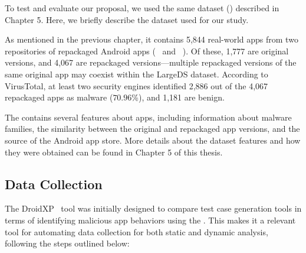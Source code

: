 

To test and evaluate our proposal, we used the same dataset (\cds) described in Chapter 5. Here, we briefly describe the dataset used for our study.

As mentioned in the previous chapter, it contains 5,844 real-world apps from two repositories of repackaged Android apps (\repack~\cite{DBLP:journals/tse/LiBK21} and \amc~\cite{rafiq2022andromalpack}). Of these, 1,777 are original versions, and 4,067 are repackaged versions—multiple repackaged versions of the same original app may coexist within the LargeDS dataset. According to VirusTotal, at least two security engines identified 2,886 out of the 4,067 repackaged apps as malware ($70.96$\%), and 1,181 are benign.

The \cds contains several features about apps, including information about malware families, the similarity between the original and repackaged app versions, and the source of the Android app store. More details about the dataset features and how they were obtained can be found in Chapter 5 of this thesis.

\subsection{Data Collection}\label{sec:data}

The DroidXP~\cite{DBLP:conf/scam/CostaMCMVBC20} tool was initially designed to compare test case generation tools in terms of identifying malicious app behaviors using the \mas. This makes it a relevant tool for automating data collection for both static and dynamic analysis, following the steps outlined below:






